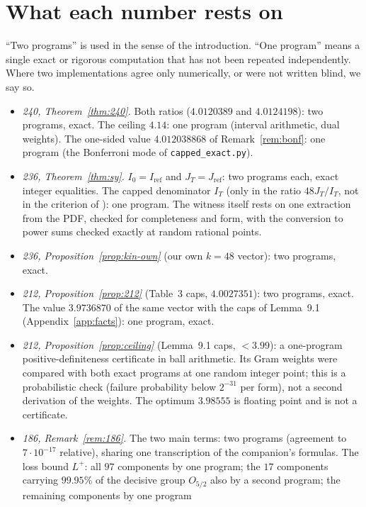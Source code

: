 \documentclass[11pt]{amsart}
\theoremstyle{definition}
\theoremstyle{remark}
\begin{document}
\section{What each number rests on}\label{sec:basis}
``Two programs'' is used in the sense of the introduction. ``One program''
means a single exact or rigorous computation that has not been repeated
independently. Where two implementations agree only numerically, or were not
written blind, we say so.
\begin{itemize}
\item \emph{240, Theorem~\ref{thm:240}.} Both ratios ($4.0120389$ and
  $4.0124198$): two programs, exact. The ceiling $4.14$: one program
  (interval arithmetic, dual weights). The one-sided value $4.012038868$
  of Remark~\ref{rem:bonf}: one program (the Bonferroni mode of
  \texttt{capped\_exact.py}).
\item \emph{236, Theorem~\ref{thm:sy}.} $I_0=I_{\mathrm{ref}}$ and
  $J_T=J_{\mathrm{ref}}$: two programs each, exact integer equalities. The
  capped denominator $I_T$ (only in the ratio $48J_T/I_T$, not in the criterion
  of \cite{SY26}): one program. The witness itself rests on one extraction from
  the PDF, checked for completeness and form, with the conversion to power sums
  checked exactly at random rational points.
\item \emph{236, Proposition~\ref{prop:kin-own}} (our own $k=48$ vector):
  two programs, exact.
\item \emph{212, Proposition~\ref{prop:212}} (Table~3 caps, $4.0027351$): two
  programs, exact. The value $3.9736870$ of the same vector with the caps of
  Lemma~9.1 (Appendix~\ref{app:facts}): one program, exact.
\item \emph{212, Proposition~\ref{prop:ceiling}} (Lemma~9.1 caps, $<3.99$): a
  one-program positive-definiteness certificate in ball arithmetic. Its Gram
  weights were compared with both exact programs at one random integer point;
  this is a probabilistic check (failure probability below $2^{-31}$ per form),
  not a second derivation of the weights. The optimum $3.98555$ is floating
  point and is not a certificate.
\item \emph{186, Remark~\ref{rem:186}.} The two main terms: two programs
  (agreement to $7\cdot10^{-17}$ relative), sharing one transcription of the
  companion's formulas. The loss bound $L^+$: all $97$ components by
  one program; the $17$ components carrying $99.95\%$ of the decisive group
  $O_{5/2}$ also by a second program; the remaining components by one program

\end{itemize}
\end{document}
